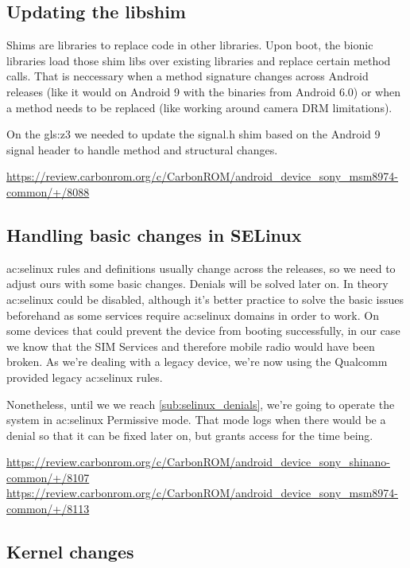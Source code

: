 \subsection{Updating the libshim}

Shims are libraries to replace code in other libraries. Upon boot, the bionic libraries load those shim libs over existing libraries and replace certain method calls.
That is neccessary when a method signature changes across Android releases (like it would on Android 9 with the binaries from Android 6.0) or when a method needs to be replaced (like working around camera DRM limitations).

On the \gls{gls:z3} we needed to update the signal.h shim based on the Android 9 signal header to handle method and structural changes.

\url{https://review.carbonrom.org/c/CarbonROM/android_device_sony_msm8974-common/+/8088}

\subsection{Handling basic changes in SELinux}

\acrshort{ac:selinux} rules and definitions usually change across the releases, so we need to adjust ours with some basic changes. Denials will be solved later on. In theory \acrshort{ac:selinux} could be disabled, although it's better practice to solve the basic issues beforehand as some services require \acrshort{ac:selinux} domains in order to work. On some devices that could prevent the device from booting successfully, in our case we know that the SIM Services and therefore mobile radio would have been broken.
As we're dealing with a legacy device, we're now using the Qualcomm provided legacy \acrshort{ac:selinux} rules.

Nonetheless, until we we reach \ref{sub:selinux_denials}, we're going to operate the system in \acrshort{ac:selinux} Permissive mode. That mode logs when there would be a denial so that it can be fixed later on, but grants access for the time being.

\url{https://review.carbonrom.org/c/CarbonROM/android_device_sony_shinano-common/+/8107}\\
\url{https://review.carbonrom.org/c/CarbonROM/android_device_sony_msm8974-common/+/8113}

\subsection{Kernel changes}


